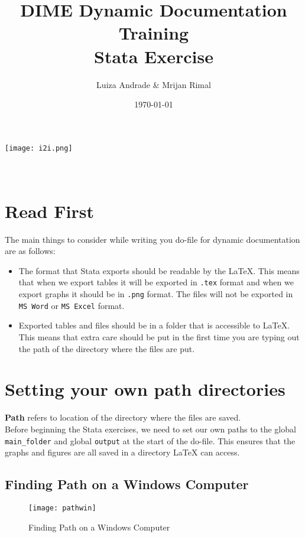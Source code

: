\documentclass[]{article}
\title{DIME Dynamic Documentation Training \\ Stata Exercise}
\author{Luiza Andrade \& Mrijan Rimal}
\date{\today}
\begin{document}
\makeatletter
\begin{titlepage}
	\begin{center}
		\texttt{[image: i2i.png]}\\[10ex]
		{\LARGE \bfseries  \@title }\\[2ex] 
		{\Large  \@author}\\[20ex] 
		{\large \@date}
	\end{center}
\end{titlepage}
\makeatother
\section{Read First}
The main things to consider while writing you do-file for dynamic documentation are as follows: 

\begin{itemize}
	\item The format that Stata exports should be readable by the {\LaTeX}. This means that when we export tables it will be exported in \texttt{.tex} format and when we export graphs it should be in \texttt{.png} format. 
		\subitem The files will not be exported in \texttt{MS Word} or \texttt{MS Excel} format.
	
	\item Exported tables and files should be in a folder that is accessible to {\LaTeX}. This means that extra care should be put in the first time you are typing out the path of the directory where the files are put. 
 \end{itemize}
\section*{Setting your own path directories}

\textbf{Path} refers to location of the directory where the files are saved. \\

Before beginning the Stata exercises, we need to set our own paths to the global \texttt{main\_folder} and global \texttt{output} at the start of the do-file. This ensures that the graphs and figures are all saved in a directory {\LaTeX} can access. 

\subsection*{Finding Path on a Windows Computer}
\begin{figure}[H]
	\centering
	\texttt{[image: pathwin]}
	\caption{Finding Path on a Windows Computer}
	\label{fig:pathwin}
\end{figure}
\end{document}
